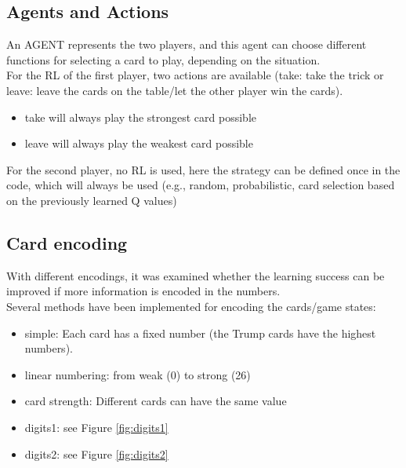 \subsection{Agents and Actions} \label{agents_actions}
An AGENT represents the two players, and this agent can choose different functions for selecting a card to play, depending on the situation. \\

For the RL of the first player, two actions are available (take: take the trick or leave: leave the cards on the table/let the other player win the cards). 
\begin{itemize}
    \item take will always play the strongest card possible
    \item leave will always play the weakest card possible
\end{itemize} 

\noindent
For the second player, no RL is used, here the strategy can be defined once in the code, which will always be used (e.g., random, probabilistic, card selection based on the previously learned Q values)
\subsection{Card encoding}
With different encodings, it was examined whether the learning success can be improved if more information is encoded in the numbers. \\
Several methods have been implemented for encoding the cards/game states:
\begin{itemize}
    \item simple: Each card has a fixed number (the Trump cards have the highest numbers).
    \item linear numbering: from weak (0) to strong (26)
    \item card strength: Different cards can have the same value
    \item digits1: see Figure \ref{fig:digits1}
    \item digits2: see Figure \ref{fig:digits2}   
\end{itemize}    

\newpage

